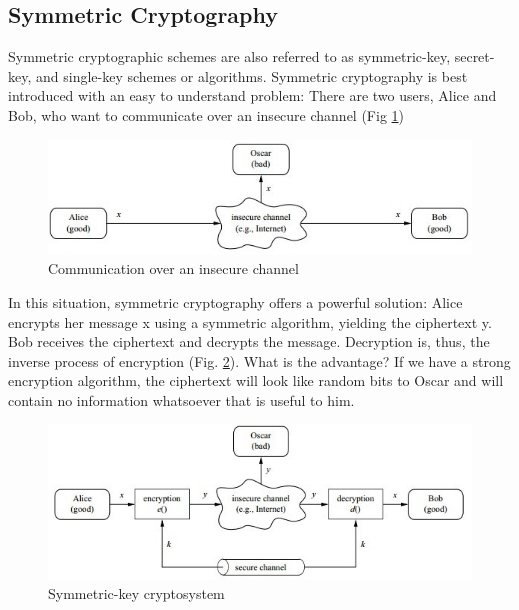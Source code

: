 \documentclass[../main.tex]{subfiles}
\begin{document}
\subsection{Symmetric Cryptography}


Symmetric cryptographic schemes are also referred to as symmetric-key, secret-key,
and single-key schemes or algorithms. Symmetric cryptography is best introduced
with an easy to understand problem: There are two users, Alice and Bob, who want
to communicate over an insecure channel\cite{10.5555/1721909} (Fig \ref{fig:cryp1})

\begin{figure}[h]
\centering
\includegraphics[width=15cm]{diagrams/cryp1.jpg}

\caption{Communication over an insecure channel}
\label{fig:cryp1}
\end{figure}

In this situation, symmetric cryptography offers a powerful solution: Alice encrypts her message x using a symmetric algorithm, yielding the ciphertext y. Bob
receives the ciphertext and decrypts the message. Decryption is, thus, the inverse
process of encryption (Fig. \ref{fig:cryp2}). What is the advantage? If we have a strong encryption algorithm, the ciphertext will look like random bits to Oscar and will contain
no information whatsoever that is useful to him.\cite{10.5555/1721909}

\begin{figure}[h]
\centering
\includegraphics[width=15cm]{diagrams/cryp2.jpg}

\caption{Symmetric-key cryptosystem}
\label{fig:cryp2}
\end{figure}
\end{document}
